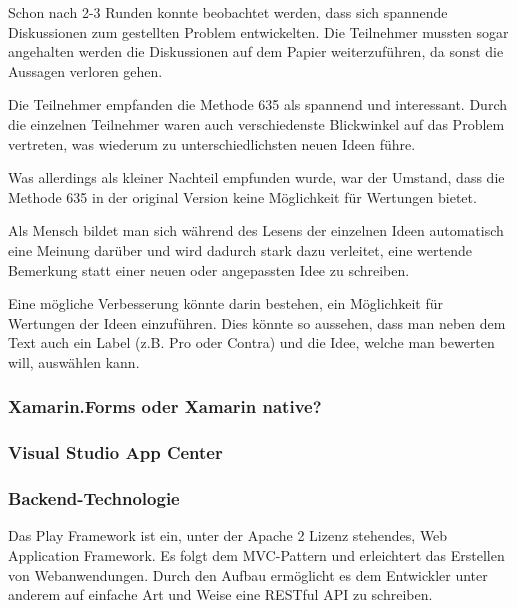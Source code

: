 \begin{description}[leftmargin=!,labelwidth=\widthof{\bfseries Interessante Methode}]
	\item[Diskussion gestartet] Schon nach 2-3 Runden konnte beobachtet werden, dass sich spannende Diskussionen zum gestellten Problem entwickelten. Die Teilnehmer mussten sogar angehalten werden die Diskussionen auf dem Papier weiterzuführen, da sonst die Aussagen verloren gehen.
	\item[Interessante Methode] Die Teilnehmer empfanden die Methode 635 als spannend und interessant. Durch die einzelnen Teilnehmer waren auch verschiedenste Blickwinkel auf das Problem vertreten, was wiederum zu unterschiedlichsten neuen Ideen führe.
	\item[Wertung einführen] Was allerdings als kleiner Nachteil empfunden wurde, war der Umstand, dass die Methode 635 in der original Version keine Möglichkeit für Wertungen bietet. 
	
	Als Mensch bildet man sich während des Lesens der einzelnen Ideen automatisch eine Meinung darüber und wird dadurch stark dazu verleitet, eine wertende Bemerkung statt einer neuen oder angepassten Idee zu schreiben.
	
	Eine mögliche Verbesserung könnte darin bestehen, ein Möglichkeit für Wertungen der Ideen einzuführen. Dies könnte so aussehen, dass man neben dem Text auch ein Label (z.B. Pro oder Contra) und die Idee, welche man bewerten will, auswählen kann.
\end{description}

\subsubsection{Xamarin.Forms oder Xamarin native?}

\subsubsection{Visual Studio App Center}


\subsubsection{Backend-Technologie}
Das Play Framework \cite{PlayFramework} ist ein, unter der Apache 2 Lizenz stehendes, Web Application Framework. Es folgt dem MVC-Pattern und erleichtert das Erstellen von Webanwendungen. Durch den Aufbau ermöglicht es dem Entwickler unter anderem auf einfache Art und Weise eine RESTful API zu schreiben. 

